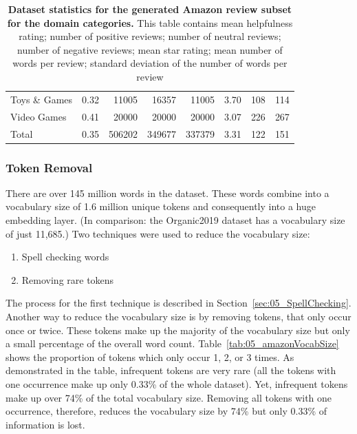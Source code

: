 \begin{table}
\begin{tabularx}{\textwidth}{lXrrrcrr}
        Toys \& Games               &   0.32 &  11005 & 16357 & 11005 &    3.70 &    108 &  114 \\
        Video Games                 &   0.41 &   20000 &      20000 & 20000 &    3.07 &    226 &  267 \\
        \midrule
        Total                        &    0.35 &        506202 &    349677& 337379&    3.31 &     122 &  151 \\
        \bottomrule
    \end{tabularx}
    \caption{\textbf{Dataset statistics for the generated Amazon review subset for the domain categories.} This table contains mean helpfulness rating; number of positive reviews; number of neutral reviews; number of negative reviews; mean star rating; mean number of words per review; standard deviation of the number of words per review }
        \label{tab:05_amazonDatasetStats}
\end{table}

\subsubsection*{Token Removal}
\label{sec:05_amazonTokens}
There are over 145 million words in the dataset. These words combine into a vocabulary size of 1.6 million unique tokens and consequently into a huge embedding layer. {(In comparison: the Organic2019 dataset has a vocabulary size of just 11,685.)} Two techniques were used to reduce the vocabulary size:

\begin{enumerate}
    \item Spell checking words
    \item Removing rare tokens
\end{enumerate}

The process for the first technique is described in Section~\ref{sec:05_SpellChecking}. Another way to reduce the vocabulary size is by removing tokens, that only occur once or twice. These tokens make up the majority of the vocabulary size but only a small percentage of the overall word count. Table~\ref{tab:05_amazonVocabSize} shows the proportion of tokens which only occur 1, 2, or 3 times. As demonstrated in the table, infrequent tokens are very rare {(all the tokens with one occurrence make up only 0.33\% of the whole dataset)}. Yet, infrequent tokens make up over 74\% of the total vocabulary size. Removing all tokens with one occurrence, therefore, reduces the vocabulary size by 74\% but only 0.33\% of information is lost.

